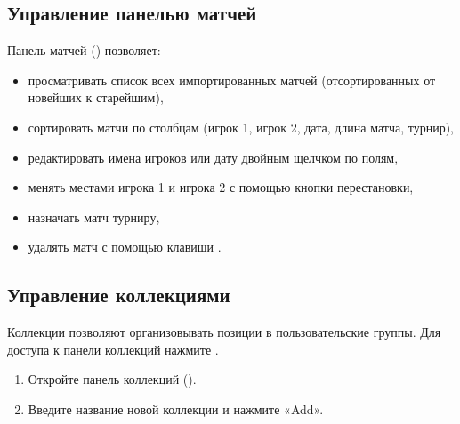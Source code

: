 \documentclass[letterpaper,10pt,russian]{sphinxmanual}
\begin{document}
\subsection{Управление панелью матчей}
\label{\detokenize{guide_utilisateur:gerer-le-panneau-des-matchs}}
\sphinxAtStartPar
Панель матчей () позволяет:
\begin{itemize}
\item {} 
\sphinxAtStartPar
просматривать список всех импортированных матчей (отсортированных от новейших к старейшим),

\item {} 
\sphinxAtStartPar
сортировать матчи по столбцам (игрок 1, игрок 2, дата, длина матча, турнир),

\item {} 
\sphinxAtStartPar
редактировать имена игроков или дату двойным щелчком по полям,

\item {} 
\sphinxAtStartPar
менять местами игрока 1 и игрока 2 с помощью кнопки перестановки,

\item {} 
\sphinxAtStartPar
назначать матч турниру,

\item {} 
\sphinxAtStartPar
удалять матч с помощью клавиши .

\end{itemize}


\subsection{Управление коллекциями}
\label{\detokenize{guide_utilisateur:gerer-les-collections}}
\sphinxAtStartPar
Коллекции позволяют организовывать позиции в пользовательские группы. Для доступа к панели коллекций нажмите .

\sphinxAtStartPar
{}
\begin{enumerate}
%
\item {} 
\sphinxAtStartPar
Откройте панель коллекций ().

\item {} 
\sphinxAtStartPar
Введите название новой коллекции и нажмите «Add».

\end{enumerate}
\end{document}
